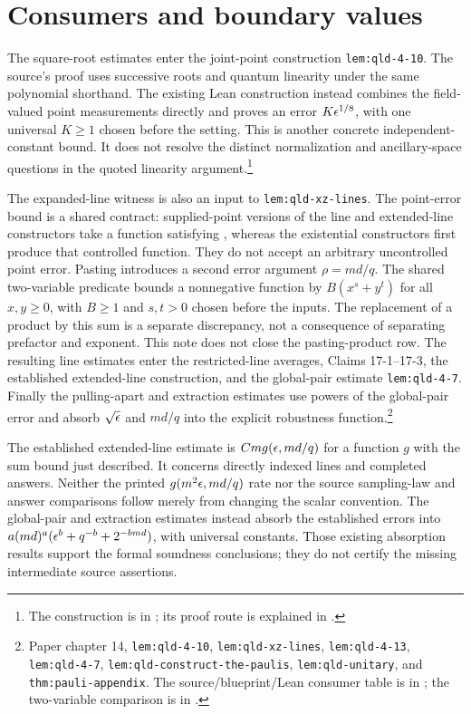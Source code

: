 \documentclass[11pt]{article}
\begin{document}
\section{Consumers and boundary values}

The square-root estimates enter the joint-point construction
\texttt{lem:qld-4-10}. The source's proof uses successive roots and
quantum linearity under the same polynomial shorthand. The existing Lean
construction instead combines the field-valued point measurements directly
and proves an error $K\epsilon^{1/8}$, with one universal $K\geq1$ chosen
before the setting. This is another concrete independent-constant bound.
It does not resolve the distinct normalization and ancillary-space
questions in the quoted linearity argument.\footnote{The construction is
 in
; its proof route is explained
in .}

The expanded-line witness is also an input to \texttt{lem:qld-xz-lines}.
The point-error bound is a shared contract: supplied-point versions of the
line and extended-line constructors take a function satisfying
, whereas the existential constructors first produce
that controlled function. They do not accept an arbitrary uncontrolled
point error. Pasting introduces a second error argument $\rho=md/q$.
The shared two-variable predicate bounds a nonnegative function by
$B(x^s+y^t)$ for all $x,y\geq0$, with $B\geq1$ and $s,t>0$ chosen
before the inputs. The replacement of a product by this sum is a separate
discrepancy, not a consequence of separating prefactor and exponent. This
note does not close the pasting-product row. The resulting line
estimates enter the restricted-line averages, Claims 17-1--17-3, the
established extended-line construction, and the global-pair estimate
\texttt{lem:qld-4-7}. Finally the pulling-apart and extraction estimates
use powers of the global-pair error and absorb $\sqrt{\epsilon}$ and $md/q$ into
the explicit robustness function.\footnote{Paper chapter 14,
\texttt{lem:qld-4-10}, \texttt{lem:qld-xz-lines}, \texttt{lem:qld-4-13},
\texttt{lem:qld-4-7}, \texttt{lem:qld-construct-the-paulis},
\texttt{lem:qld-unitary}, and \texttt{thm:pauli-appendix}.
The source/blueprint/Lean consumer table is in
; the two-variable
comparison is in .}

The established extended-line estimate is $C m g(\epsilon,md/q)$ for a
function $g$ with the sum bound just described. It concerns directly
indexed lines and completed answers. Neither the printed
$g(m^2\epsilon,md/q)$ rate nor the source sampling-law and answer comparisons
follow merely from changing the scalar convention. The global-pair and
extraction estimates instead absorb the established errors into
$a(md)^a(\epsilon^b+q^{-b}+2^{-bmd})$, with universal constants. Those
existing absorption results support the formal soundness conclusions;
they do not certify the missing intermediate source assertions.
\end{document}
